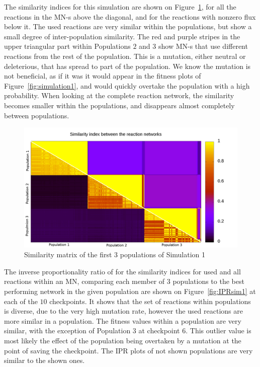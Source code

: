 \documentclass[a4paper,12pt]{article}
\begin{document}
The similarity indices for this simulation are shown on Figure~\ref{fig:simmatrix_firstjob}, for all the reactions in the MN-s above the diagonal, and for the reactions with nonzero flux below it. The used reactions are very similar within the populations, but show a small degree of inter-population similarity. The red and purple stripes in the upper triangular part within Populations $2$ and $3$ show MN-s that use different reactions from the rest of the population. This is a mutation, either neutral or deleterious, that has spread to part of the population. We know the mutation is not beneficial, as if it was it would appear in the fitness plots of Figure~\ref{fig:simulation1}, and would quickly overtake the population with a high probability. When looking at the complete reaction network, the similarity becomes smaller within the populations, and disappears almost completely between populations. 

\begin{figure}[htpb]
	\centering
	\includegraphics[width=1\linewidth]{simmatrix_firstjob.png}
	\caption{Similarity matrix of the first 3 populations of Simulation 1}
	\label{fig:simmatrix_firstjob}
\end{figure}

The inverse proportionality ratio of for the similarity indices for used and all reactions within an MN, comparing each member of $3$ populations to the best performing network in the given population are shown on Figure~\ref{fig:IPRsim1} at each of the $10$ checkpoints. It shows that the set of reactions within populations is diverse, due to the very high mutation rate, however the used reactions are more similar in a population. The fitness values within a population are very similar, with the exception of Population $3$ at checkpoint $6$. This outlier value is most likely the effect of the population being overtaken by a mutation at the point of saving the checkpoint. The IPR plots of not shown populations are very similar to the shown ones. 
\end{document}
